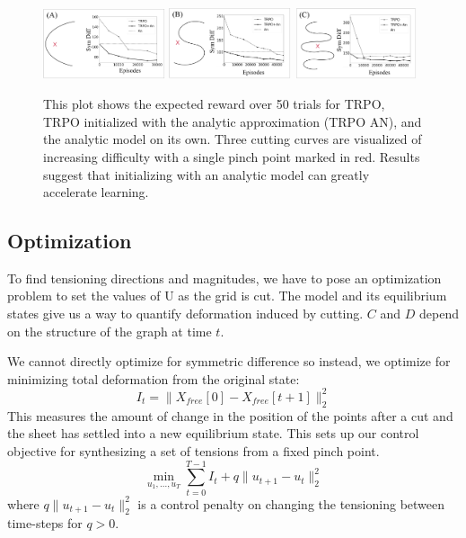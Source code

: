 \begin{figure}[t]
\includegraphics[width=0.32\textwidth]{tps-experiments/trpo-full-a.png}
\includegraphics[width=0.32\textwidth]{tps-experiments/trpo-full-b.png}
\includegraphics[width=0.32\textwidth]{tps-experiments/trpo-full-c.png}
\caption{This plot shows the expected reward over 50 trials for TRPO, TRPO initialized with the analytic approximation (TRPO AN), and the analytic model on its own. Three cutting curves are visualized of increasing difficulty with a single pinch point marked in red. Results suggest that initializing with an analytic model can greatly accelerate learning.\label{fig:1}}
\end{figure}

\subsection*{Optimization}
To find tensioning directions and magnitudes, we have to pose an optimization problem to set the values of U as the grid is cut.
The model and its equilibrium states give us a way to quantify deformation induced by cutting.
$C$ and $D$ depend on the structure of the graph at time $t$.

We cannot directly optimize for symmetric difference so instead, we optimize for minimizing total deformation from the original state:
\[ I_{t} =  \| X_{free}[0] - X_{free}[t+1] \|^2_2 \]
This measures the amount of change in the position of the points after a cut and the sheet has settled into a new equilibrium state.
This sets up our control objective for synthesizing a set of tensions from a fixed pinch point. 
\begin{equation}
   \min_{u_1,...,u_T} \sum_{t=0}^{T-1} I_{t} + q \|u_{t+1} - u_t \|_2^2  \label{obj}
\end{equation}
where $q \|u_{t+1} - u_t \|^2_2$ is a control penalty on changing the tensioning between time-steps for $q > 0$. 


